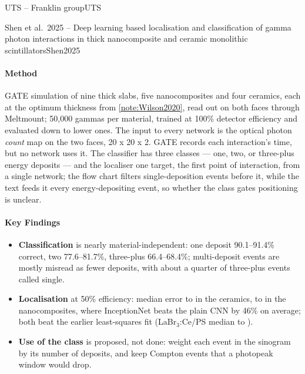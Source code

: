 \begin{programnote}{UTS -- Franklin group}{UTS}
\begin{papernote}{Shen et al.\ 2025 -- Deep learning based localisation and classification of gamma photon interactions in thick nanocomposite and ceramic monolithic scintillators}{Shen2025}
\paragraph{Method}
GATE simulation of nine thick slabs, five nanocomposites and four ceramics,
each at the optimum thickness from \ref{note:Wilson2020}, read out on both
faces through Meltmount; 50{,}000 gammas per material, trained at 100\%
detector efficiency and evaluated down to lower ones. The input to every
network is the optical photon \emph{count} map on the two faces, 20 x 20 x 2.
GATE records each interaction's time, but no network uses it. The classifier
has three classes --- one, two, or three-plus energy deposits --- and the
localiser one target, the first point of interaction, from a single network;
the flow chart filters single-deposition events before it, while the text
feeds it every energy-depositing event, so whether the class gates
positioning is unclear.

\paragraph{Key Findings}
\begin{itemize}
	\item \textbf{Classification} is nearly material-independent: one
		deposit 90.1--91.4\% correct, two 77.6--81.7\%, three-plus
		66.4--68.4\%; multi-deposit events are mostly misread as fewer
		deposits, with about a quarter of three-plus events called single.
	\item \textbf{Localisation} at 50\% efficiency: median error
		 to  in the ceramics,  to  in
		the nanocomposites, where InceptionNet beats the plain CNN by 46\% on
		average; both beat the earlier least-squares fit (LaBr$_3$:Ce/PS
		median  to ).
	\item \textbf{Use of the class} is proposed, not done: weight each event
		in the sinogram by its number of deposits, and keep Compton events
		that a photopeak window would drop.
\end{itemize}


\end{papernote}
\end{programnote}
